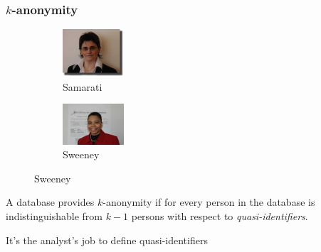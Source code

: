 \begin{frame}
  \frametitle{$k$-anonymity}
  \begin{figure}[H]
    \centering
    \begin{subfigure}{0.45\textwidth}
      \includegraphics[width=0.25\textwidth]{../figures/samarati}
      \caption{Samarati}
    \end{subfigure}
    \begin{subfigure}{0.45\textwidth}
      \includegraphics[width=0.25\textwidth]{../figures/sweeney}
      \caption{Sweeney}
    \end{subfigure}
  \end{figure}

  \begin{definition}[$k$-anonymity]
    A database provides $k$-anonymity if for every person in the database is indistinguishable from $k-1$ persons with respect to \emph{quasi-identifiers}.
  \end{definition}
  \alert{It's the analyst's job to define quasi-identifiers}
  
\end{frame}

